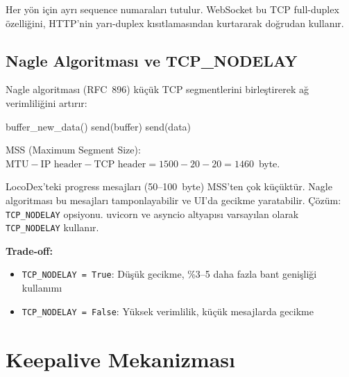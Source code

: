 Her y\"{o}n i\c{c}in ayr{\i} sequence numaralar{\i} tutulur. WebSocket bu TCP full-duplex \"{o}zelli\u{g}ini, HTTP'nin yar{\i}-duplex k{\i}s{\i}tlamas{\i}ndan kurtararak do\u{g}rudan kullan{\i}r.

\subsection{Nagle Algoritmas{\i} ve TCP\_NODELAY}
\label{sec:nagle}

Nagle algoritmas{\i} (RFC~896) k\"{u}\c{c}\"{u}k TCP segmentlerini birle\c{s}tirerek a\u{g} verimlili\u{g}ini art{\i}r{\i}r:

\begin{algorithm}[H]
\caption{Nagle Algoritmas{\i}}
\label{alg:nagle}
\begin{algorithmic}[1]
  \State buffer\_new\_data() 
    \State send(buffer) 
  \EndIf
\Else
  \State send(data) 
\EndIf
\end{algorithmic}
\end{algorithm}

MSS (Maximum Segment Size): $\text{MTU} - \text{IP header} - \text{TCP header} = 1500 - 20 - 20 = 1460$~byte.

\begin{dikkat}
LocoDex'teki progress mesajlar{\i} (50--100~byte) MSS'ten \c{c}ok k\"{u}\c{c}\"{u}kt\"{u}r. Nagle algoritmas{\i} bu mesajlar{\i} tamponlayabilir ve UI'da gecikme yaratabilir. \c{C}\"{o}z\"{u}m: \texttt{TCP\_NODELAY} opsiyonu. uvicorn ve asyncio altyap{\i}s{\i} varsay{\i}lan olarak \texttt{TCP\_NODELAY} kullan{\i}r.

\textbf{Trade-off:}
\begin{itemize}
  \item \texttt{TCP\_NODELAY = True}: D\"{u}\c{s}\"{u}k gecikme, \%3--5 daha fazla bant geni\c{s}li\u{g}i kullan{\i}m{\i}
  \item \texttt{TCP\_NODELAY = False}: Y\"{u}ksek verimlilik, k\"{u}\c{c}\"{u}k mesajlarda gecikme
\end{itemize}
\end{dikkat}


\section{Keepalive Mekanizmas{\i}}
\label{sec:keepalive}

